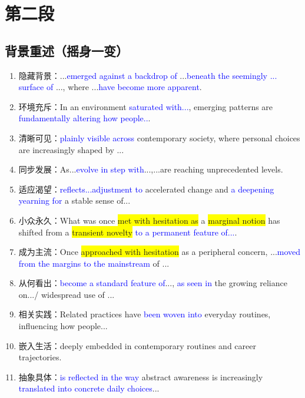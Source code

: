 ﻿\documentclass[lang=cn,11pt]{elegantbook}
\begin{document}
\section{第二段}

\subsection{背景重述（摇身一变）}

\begin{enumerate}
    \item 隐藏背景：...\textcolor{blue}{emerged against a backdrop of} ...\textcolor{blue}{beneath the seemingly ... surface of} ..., where ...\textcolor{blue}{have become more apparent}.
    \item 环境充斥：In an environment \textcolor{blue}{saturated with...}, emerging patterns are \textcolor{blue}{fundamentally altering how people..}.
    \item 清晰可见：\textcolor{blue}{plainly visible across} contemporary society, where personal choices are increasingly shaped by ...
    \item 同步发展：As...\textcolor{blue}{evolve in step with}...,...are reaching unprecedented levels.
    \item 适应渴望：\textcolor{blue}{reflects...adjustment to} accelerated change and \textcolor{blue}{a deepening yearning for} a stable sense of...
    \item 小众永久：What was once \colorbox{yellow}{met with hesitation as} a \colorbox{yellow}{marginal notion} has shifted from a \colorbox{yellow}{transient novelty} \textcolor{blue}{to a permanent feature of...}. 
    \item 成为主流：Once \colorbox{yellow}{approached with hesitation} as a peripheral concern, ...\textcolor{blue}{moved from the margins to the mainstream} of ...
    \item 从何看出：\textcolor{blue}{become a standard feature of}..., \textcolor{blue}{as seen in} the growing reliance on.../ widespread use of ...
    \item 相关实践：Related practices have \textcolor{blue}{been woven into} everyday routines, influencing how people...
    \item 嵌入生活：deeply embedded in contemporary routines and career trajectories.
    \item 抽象具体：\textcolor{blue}{is reflected in the way} abstract awareness is increasingly \textcolor{blue}{translated into concrete daily choices}...
\end{enumerate}
\end{document}
